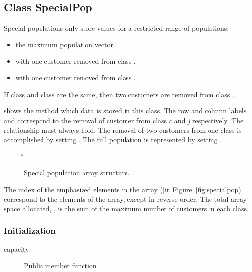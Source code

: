 \subsection{Class SpecialPop}
\label{sec:special-population}

Special populations only store values for a restricted range of
populations:
\begin{itemize}
\item the maximum population vector.
\item with one customer removed from class .
\item with one customer removed from class .
\end{itemize}
If class  and class  are the same, then two customers
are removed from class .  

 shows
the method which data is stored in this class.  The row and column
labels  and  correspond to the removal of 
customer from class \emph{c} and \emph{j} respectively.  The
relationship  must always hold.  The removal
of two customers from one class is accomplished by setting
.  The full population is represented
by setting .

\begin{figure}[htbp]
  \label{fig:specialpop}
  \begin{center}
    \T \tex \leavevmode 
    \caption{Special population array structure.}
    \H {}
  \end{center}
\end{figure}

The index of the emphasized elements in the array ([in Figure~\Ref]{fig:specialpop}) correspond to the elements
of the  array, except in
reverse order.  The total array space allocated,
, is the sum of the maximum
number of customers in each class.

\subsubsection{Initialization}
\begin{description}
\item[capacity] \texonly{---} Public member function\\
\end{description}

